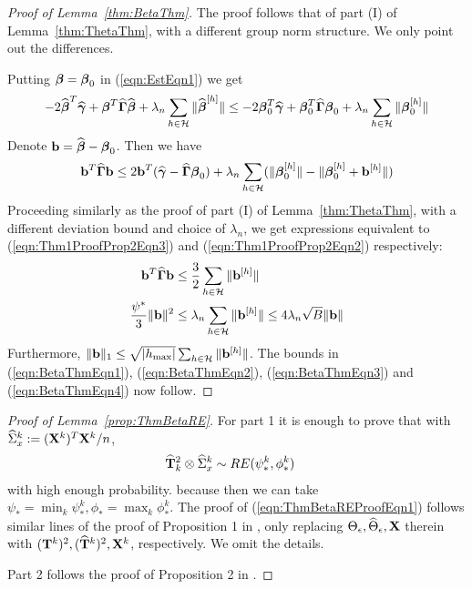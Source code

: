 \begin{proof}[Proof of Lemma~\ref{thm:BetaThm}]
The proof follows that of part (I) of Lemma~\ref{thm:ThetaThm}, with a different group norm structure. We only point out the differences.

Putting ${\boldsymbol{\beta}} = {\boldsymbol{\beta}}_0$ in (\ref{eqn:EstEqn1}) we get
%
$$
-2 \widehat {{\boldsymbol{\beta}}}^T \widehat {{\boldsymbol{\gamma}}} + {\boldsymbol{\beta}}^T \widehat {{\boldsymbol{\Gamma}}} \widehat {{\boldsymbol{\beta}}} + \lambda_n \sum_{h \in {\cal{H}}} \| \widehat {{\boldsymbol{\beta}}}^{[h]}  \| \leq
-2 {\boldsymbol{\beta}}_0^T \widehat {{\boldsymbol{\gamma}}} + {\boldsymbol{\beta}}_0^T \widehat {{\boldsymbol{\Gamma}}} {\boldsymbol{\beta}}_0 + \lambda_n \sum_{h \in {\cal{H}}} \| {\boldsymbol{\beta}}_0^{[h]}  \|
$$
%
Denote ${\bf{b}} = \widehat {{\boldsymbol{\beta}}} - {\boldsymbol{\beta}}_0$. Then we have
%
$$
{\bf{b}}^T \widehat {{\boldsymbol{\Gamma}}} {\bf{b}} \leq 2 {\bf{b}}^T ( \widehat {{\boldsymbol{\gamma}}} - \widehat {{\boldsymbol{\Gamma}}} {\boldsymbol{\beta}}_0 ) + \lambda_n
\sum_{h \in {\cal{H}}} ( \| {\boldsymbol{\beta}}_0^{[h]} \| - \| {\boldsymbol{\beta}}_0^{[h]} + {\bf{b}}^{[h]} \|)
$$
%
Proceeding similarly as the proof of part (I) of Lemma~\ref{thm:ThetaThm}, with a different deviation bound and choice of $\lambda_n$, we get expressions equivalent to (\ref{eqn:Thm1ProofProp2Eqn3}) and (\ref{eqn:Thm1ProofProp2Eqn2}) respectively:
%
\begin{align}
{\bf{b}}^T \widehat {{\boldsymbol{\Gamma}}} {\bf{b}} & \leq \frac{3}{2} \sum_{h \in {\cal{H}}} \| {\bf{b}}^{[h]} \| \\
\frac{\psi^*}{3} \| {\bf{b}} \|^2 & \leq \lambda_n \sum_{h \in {\cal{H}}} \| {\bf{b}}^{[h]} \| \leq 4 \lambda_n \sqrt{B} \| {\bf{b}} \|
\end{align}
%
Furthermore, $\| {\bf{b}} \|_1 \leq \sqrt{ | h_{\max} |} \sum_{h \in {\cal{H}}} \| {\bf{b}}^{[h]} \| $. The bounds in (\ref{eqn:BetaThmEqn1}), (\ref{eqn:BetaThmEqn2}), (\ref{eqn:BetaThmEqn3}) and (\ref{eqn:BetaThmEqn4}) now
follow.

\end{proof}

\begin{proof}[Proof of Lemma~\ref{prop:ThmBetaRE}]
For part 1 it is enough to prove that with $ \widehat \Sigma_x^k := ({\mathbf{X}}^k)^T {\mathbf{X}}^k/n$,
%
\begin{align}\label{eqn:ThmBetaREProofEqn1}
\widehat {{\mathbf{T}}}_k^2 \otimes \widehat \Sigma_x^k & \sim RE (\psi_*^k, \phi_*^k)
\end{align}
%
with high enough probability. because then we can take $\psi_* = \min_k \psi_*^k, \phi_* = \max_k \phi_*^k$. The proof of (\ref{eqn:ThmBetaREProofEqn1}) follows similar lines of the proof of Proposition 1 in \cite{LinEtal16}, only replacing $\Theta_\epsilon, \widehat \Theta_\epsilon, {\mathbf{X}}$ therein with $({\mathbf{T}}^k)^2, (\widehat {{\mathbf{T}}}^k)^2, {\mathbf{X}}^k$, respectively. We omit the details.

Part 2 follows the proof of Proposition 2 in \cite{LinEtal16}.
\end{proof}

